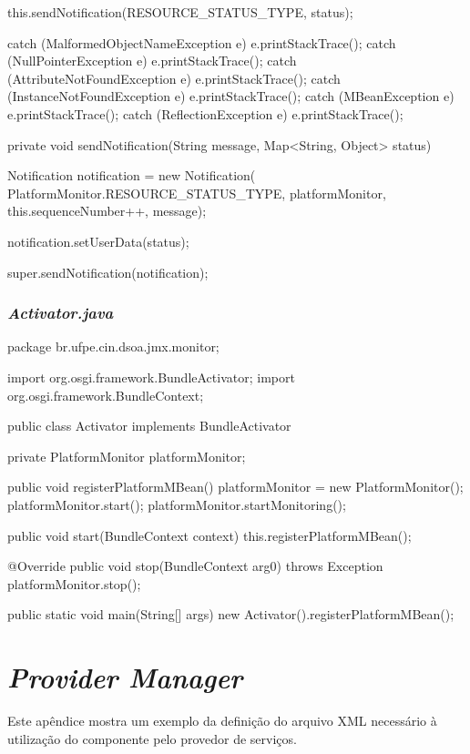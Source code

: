 \begin{verbatimtab}[4]
{{{{				this.sendNotification(RESOURCE_STATUS_TYPE, status);
			}

		} catch (MalformedObjectNameException e) {
			e.printStackTrace();
		} catch (NullPointerException e) {
			e.printStackTrace();
		} catch (AttributeNotFoundException e) {
			e.printStackTrace();
		} catch (InstanceNotFoundException e) {
			e.printStackTrace();
		} catch (MBeanException e) {
			e.printStackTrace();
		} catch (ReflectionException e) {
			e.printStackTrace();
		}
	}

	private void sendNotification(String message, 
		Map<String, Object> status) {

		Notification notification = new Notification(
				PlatformMonitor.RESOURCE_STATUS_TYPE, platformMonitor,
				this.sequenceNumber++, message);

		notification.setUserData(status);

		super.sendNotification(notification);
	}
}
\end{verbatimtab}

\subsection*{\!\textsl{\textbf{Activator.java}}}
\small
\begin{verbatimtab}[4]
package br.ufpe.cin.dsoa.jmx.monitor;

import org.osgi.framework.BundleActivator;
import org.osgi.framework.BundleContext;

public class Activator implements BundleActivator {
	private PlatformMonitor platformMonitor;

	public void registerPlatformMBean() {
		platformMonitor = new PlatformMonitor();
		platformMonitor.start();
		platformMonitor.startMonitoring();
	}

	public void start(BundleContext context) {
		this.registerPlatformMBean();
	}

	@Override
	public void stop(BundleContext arg0) throws Exception {
		platformMonitor.stop();
	}

	public static void main(String[] args) {
		new Activator().registerPlatformMBean();
	}
}
\end{verbatimtab}


\chapter{\textit{Provider Manager}}

Este apêndice mostra um exemplo da definição do arquivo XML necessário à utilização do componente pelo provedor de serviços.

